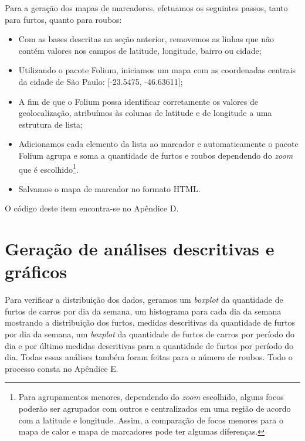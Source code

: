 \documentclass[
	12pt,
	openright,			%
	twoside,			%
	a4paper,			%
	chapter=TITLE,		%
	section=TITLE,		%
	subsection=TITLE,	%
	subsubsection=TITLE,%
	english,			%
	french,				%
	spanish,			%
	brazil				%
	]{abntex2}
\begin{document}
Para a geração dos mapas de marcadores, efetuamos os seguintes passos, tanto para furtos, quanto para roubos:
\begin{itemize}
    \item Com as bases descritas na seção anterior, removemos as linhas que não contém valores nos campos de latitude, longitude, bairro ou cidade;
    \item Utilizando o pacote Folium, iniciamos um mapa com as coordenadas centrais da cidade de São Paulo: [-23.5475, -46.63611];
    \item A fim de que o Folium possa identificar corretamente os valores de geolocalização, atribuímos às colunas de latitude e de longitude a uma estrutura de lista;
    \item Adicionamos cada elemento da lista ao marcador e automaticamente o pacote Folium agrupa e soma a quantidade de furtos e roubos dependendo do \textit{zoom} que é escolhido\footnote{Para agrupamentos menores, dependendo do \textit{zoom} escolhido, alguns focos poderão ser agrupados com outros e centralizados em uma região de acordo com a latitude e longitude. Assim, a comparação de focos menores para o mapa de calor e mapa de marcadores pode ter algumas diferenças.}. 
    \item Salvamos o mapa de marcador no formato HTML.
\end{itemize}


O código deste item encontra-se no Apêndice D.

\section{Geração de análises descritivas e gráficos}
Para verificar a distribuição dos dados, geramos um \textit{boxplot} da quantidade de furtos de carros por dia da semana, um histograma para cada dia da semana mostrando a distribuição dos furtos, medidas descritivas da quantidade de furtos por dia da semana, um \textit{boxplot} da quantidade de furtos de carros por período do dia e por último medidas descritivas para a  quantidade de furtos por período do dia. Todas essas análises também foram feitas para o número de roubos. Todo o processo consta no Apêndice E.
\end{document}
